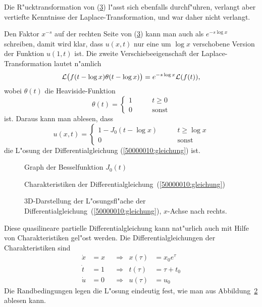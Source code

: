 \begin{diskussion}
Die R"ucktransformation von (\ref{50000010:loesung}) l"asst sich
ebenfalls durchf"uhren, verlangt aber vertiefte Kenntnisse der
Laplace-Transformation, und war daher nicht verlangt.

Den Faktor $x^{-s}$ auf der rechten Seite von (\ref{50000010:loesung})
kann man auch als $e^{-s\log x}$
schreiben, damit wird klar, dass $u(x,t)$ nur eine um $\log x$ verschobene
Version der Funktion $u(1,t)$ ist. 
Die zweite Verschiebeeigenschaft der Laplace-Transformation lautet n"amlich
\[
{\cal L}\bigl(f(t-\log x)\theta(t-\log x)\bigr)
=
e^{-s\log x}{\cal L}(f(t)),
\]
wobei $\theta(t)$ die Heaviside-Funktion
\[
\theta(t)=\begin{cases}1\qquad&t \ge 0\\ 0&\text{sonst}\end{cases}
\]
ist. Daraus kann man ablesen, dass
\begin{equation}
u(x,t)=\begin{cases}
1-J_0(t-\log x)\qquad
&t \ge \log x\\
0
&\text{sonst}
\end{cases}
\label{50000010:ruecktransformiert}
\end{equation}
die L"osung der Differentialgleichung (\ref{50000010:gleichung}) ist.
\begin{figure}
\centering
{}
\caption{Graph der Besselfunktion $J_0(t)$
\label{50000010:besselj0}}
\end{figure}
\begin{figure}
\centering
{}
\caption{Charakteristiken der Differentialgleichung~(\ref{50000010:gleichung})
\label{50000010:charakteristiken}}
\end{figure}
\begin{figure}
\centering
{}
\caption{3D-Darstellung der L"osungsfl"ache der
Differentialgleichung~(\ref{50000010:gleichung}), $x$-Achse nach rechts.
\label{50000010:loesung}}
\end{figure}


Diese quasilineare partielle Differentialgleichung kann nat"urlich auch
mit Hilfe von Charakteristiken gel"ost werden.
Die Differentialgleichungen der Charakteristiken sind
\begin{equation}
\begin{aligned}
\dot x&=x&
&\Rightarrow&
x(\tau)&=x_0e^\tau
\\
\dot t&=1&
&\Rightarrow&
t(\tau)&=\tau + t_0
\\
\dot u&=0&
&\Rightarrow&
u(\tau)&=u_0
\end{aligned}
\label{50000010:chardgl}
\end{equation}
Die Randbedingungen legen die L"osung eindeutig fest, wie man aus
Abbildung~\ref{50000010:charakteristiken} ablesen kann.


\end{diskussion}
